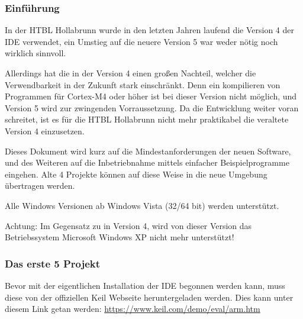 \subsubsection{Einführung}
\label{sec:tut-intro}

In der HTBL Hollabrunn wurde in den letzten Jahren laufend die Version 4 der \gls{IDE} \uVision{} verwendet, ein Umstieg auf die neuere Version 5 war weder nötig noch wirklich sinnvoll.

Allerdings hat die \uVision{} in der Version 4 einen großen Nachteil, welcher die Verwendbarkeit in der Zukunft stark einschränkt. Denn ein kompilieren von Programmen für Cortex-M4 oder höher ist bei dieser Version nicht möglich, und Version 5 wird zur zwingenden Vorraussetzung. Da die Entwicklung weiter voran schreitet, ist es für die HTBL Hollabrunn nicht mehr praktikabel die veraltete Version 4 einzusetzen.

Dieses Dokument wird kurz auf die Mindestanforderungen der neuen Software, und des Weiteren auf die Inbetriebnahme mittels einfacher Beispielprogramme eingehen. Alte \uVision{} 4 Projekte können auf diese Weise in die neue Umgebung übertragen werden.

Alle Windows Versionen ab Windows Vista (32/64 bit) werden unterstützt.

\begin{warning}
  Achtung: Im Gegensatz zu \uVision{} in Version 4, wird von dieser Version das Betriebssystem Microsoft Windows XP nicht mehr unterstützt!
\end{warning}

\subsubsection{Das erste \uVision{} 5 Projekt}
\label{sec:tut-firstproject}
\label{sec:tut-firstproject1}
Bevor mit der eigentlichen Installation der \gls{IDE} begonnen werden kann, muss diese von der offiziellen \gls{Keil} Webseite heruntergeladen werden. Dies kann unter diesem Link getan werden:
\url{https://www.keil.com/demo/eval/arm.htm}

